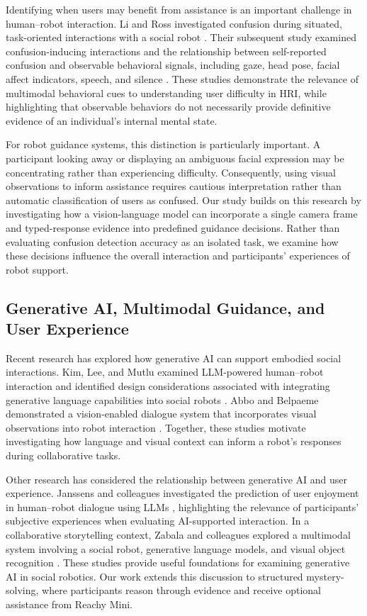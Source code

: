 \documentclass[conference]{IEEEtran}
\begin{document}
Identifying when users may benefit from assistance is an important challenge in human--robot interaction. Li and Ross investigated confusion during situated, task-oriented interactions with a social robot \cite{li2023hmm}. Their subsequent study examined confusion-inducing interactions and the relationship between self-reported confusion and observable behavioral signals, including gaze, head pose, facial affect indicators, speech, and silence \cite{li2023invoking}. These studies demonstrate the relevance of multimodal behavioral cues to understanding user difficulty in HRI, while highlighting that observable behaviors do not necessarily provide definitive evidence of an individual's internal mental state.

For robot guidance systems, this distinction is particularly important. A participant looking away or displaying an ambiguous facial expression may be concentrating rather than experiencing difficulty. Consequently, using visual observations to inform assistance requires cautious interpretation rather than automatic classification of users as confused. Our study builds on this research by investigating how a vision-language model can incorporate a single camera frame and typed-response evidence into predefined guidance decisions. Rather than evaluating confusion detection accuracy as an isolated task, we examine how these decisions influence the overall interaction and participants' experiences of robot support.

\subsection{Generative AI, Multimodal Guidance, and User Experience}

Recent research has explored how generative AI can support embodied social interactions. Kim, Lee, and Mutlu examined LLM-powered human--robot interaction and identified design considerations associated with integrating generative language capabilities into social robots \cite{kim2024understanding}. Abbo and Belpaeme demonstrated a vision-enabled dialogue system that incorporates visual observations into robot interaction \cite{abbo2025blind}. Together, these studies motivate investigating how language and visual context can inform a robot's responses during collaborative tasks.

Other research has considered the relationship between generative AI and user experience. Janssens and colleagues investigated the prediction of user enjoyment in human--robot dialogue using LLMs \cite{janssens2025online}, highlighting the relevance of participants' subjective experiences when evaluating AI-supported interaction. In a collaborative storytelling context, Zabala and colleagues explored a multimodal system involving a social robot, generative language models, and visual object recognition \cite{zabala2025storytelling}. These studies provide useful foundations for examining generative AI in social robotics. Our work extends this discussion to structured mystery-solving, where participants reason through evidence and receive optional assistance from Reachy Mini.
\end{document}

